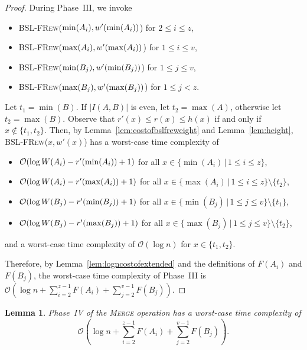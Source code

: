 \documentclass[11pt]{article}
\newcommand{\kwUnion}{Merge}
\newcommand{\Union}{\mbox{\textsc{\kwUnion{}}}}
\newcommand{\Bslfrewx}[2]{\mbox{\textsc{BSL-FRew(\ensuremath{#1,#2})}}}
\newcommand{\lasta}{z}
\newcommand{\lastb}{v}
\newcommand{\nodeheight}[1]{\ensuremath{h(#1)}}
\newcommand{\intmax}[1]{\ensuremath{\max(\intl #1)}}
\newcommand{\intmin}[1]{\ensuremath{\min(\intl #1)}}
\newcommand{\intnum}[2]{\ensuremath{|I(\set{#1},\set{#2})|}}
\newcommand{\intl}[1]{\ensuremath{#1}}
\newcommand{\intweight}[1]{{\ensuremath{W(\intl #1)}}}
\newcommand{\nodenewweight}[1]{{\ensuremath{w'(\node #1)}}}
\newcommand{\noderank}[1]{\ensuremath{r(\node #1)}}
\newcommand{\nodenewrank}[1]{\ensuremath{r'(\node #1)}}
\newcommand{\node}[1]{\ensuremath{#1}}
\newcommand{\set}[1]{\ensuremath{#1}}
\newcommand{\intfun}[1]{\ensuremath{F(\intl #1)}}
\newcounter{count}
\newtheorem{lemma}[count]{Lemma}
\begin{document}
\begin{proof} 
During Phase~III, we invoke 

\begin{itemize} 
\item \Bslfrewx{\intmin{A_i}}{\nodenewweight{\intmin{A_i}}} \quad for  $2\leq i \leq \lasta$, 
\item \Bslfrewx{\intmax{A_i}}{\nodenewweight{\intmax{A_i}}} \quad for  $1\leq i \leq \lastb$, 
\item \Bslfrewx{\intmin{B_j}}{\nodenewweight{\intmin{B_j}}} \quad for  $1\leq j \leq \lastb$, 
\item \Bslfrewx{\intmax{B_j}}{\nodenewweight{\intmax{B_j}}} \quad for  $1\leq j < \lasta$. 
\end{itemize} 



Let $t_1 = \intmin{B}$. If \intnum{A}{B} is even, let $t_2=\intmax{A}$, otherwise let $t_2 = \intmax{B}$. Observe that $\nodenewrank{x}\leq\noderank x\leq\nodeheight{x}$ if and only if $x\not\in \{t_1,t_2\}$. 
Then, by Lemma~\ref{lem:costofbslfreweight} and Lemma~\ref{lem:height}, \Bslfrewx{x}{\nodenewweight{x}} has a worst-case time complexity of 
\begin{itemize} 
\item ${\cal O}(\log\intweight{A_i} - \nodenewrank{\intmin{A_i}}+1)$ for all 
$x\in \{\intmin{A_i}\,|\,1\leq i\leq\lasta\}$, 
\item ${\cal O}(\log\intweight{A_i} - \nodenewrank{\intmax{A_i}}+1)$ for all 
$x\in \{\intmax{A_i}\,|\,1\leq i\leq\lasta\}\setminus\{t_2\}$, 
\item ${\cal O}(\log\intweight{B_j} - \nodenewrank{\intmin{B_j}}+1)$ for all 
$x\in \{\intmin{B_j}\,|\,1\leq j\leq\lastb\}\setminus\{t_1\}$, 
\item ${\cal O}(\log\intweight{B_j} - \nodenewrank{\intmax{B_j}}+1)$ for all 
$x\in \{\intmax{B_j}\,|\,1\leq j\leq\lastb\}\setminus\{t_2\}$, 
\end{itemize} 
and a worst-case time complexity of $\mathcal O(\log n)$ for $x\in\{t_1,t_2\}$. 

Therefore, by Lemma~\ref{lem:logncostofextended} and the definitions of \intfun{A_i} and \intfun{B_j}, the worst-case time complexity of Phase~III is $\mathcal O\left(\log n + \sum_{i=2}^{\lasta-1} \intfun{A_i}  +\sum_{j=2}^{\lastb-1} \intfun{B_j} \right).$ 

\end{proof} 


\begin{lemma} 
\label{lem:phasefour} 
Phase~IV of the \Union{} operation has a worst-case time complexity of \[\mathcal O\left(\log n+\sum_{i=2}^{\lasta-1} \intfun{A_i} +\sum_{j=2}^{\lastb-1} \intfun{B_j} \right).\] 
\end{lemma} 
\end{document}
